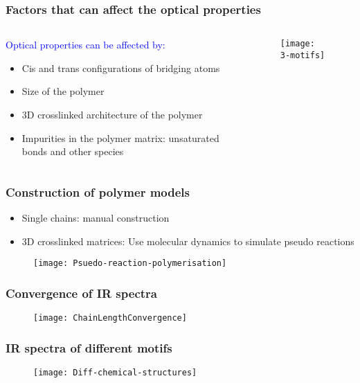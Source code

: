 \documentclass[xcolor=table,aspectratio=169]{beamer}
\begin{document}
\begin{frame}
	\frametitle{Factors that can affect the optical properties}
	\begin{columns}
		\begin{column}{0.55\textwidth}
			\textcolor{blue}{Optical properties can be affected by:}
			\begin{itemize}
				\item Cis and trans configurations of bridging atoms
				\item Size of the polymer
				\item 3D crosslinked architecture of the polymer
				\item Impurities in the polymer matrix: unsaturated bonds and other species
			\end{itemize}
		\end{column}
		\begin{column}{0.48\textwidth}
			\vspace{-0.2cm}
			\begin{figure}
				\texttt{[image: 3-motifs]}
			\end{figure}
		\end{column}
	\end{columns}
\end{frame}


\begin{frame}
	\frametitle{Construction of polymer models}
	\begin{itemize}
		\item Single chains: manual construction
		\item 3D crosslinked matrices: Use molecular dynamics to simulate pseudo reactions
	\end{itemize}
	\begin{figure}
		\texttt{[image: Psuedo-reaction-polymerisation]}
	\end{figure}

\end{frame}



\begin{frame}
	\frametitle{Convergence of IR spectra}
	\begin{figure}
		\texttt{[image: ChainLengthConvergence]}
	\end{figure}
\end{frame}


\begin{frame}
	\frametitle{IR spectra of different motifs}
	\begin{figure}
		\texttt{[image: Diff-chemical-structures]}
	\end{figure}
\end{frame}
\end{document}
